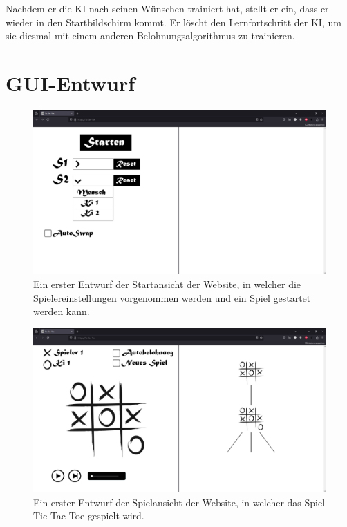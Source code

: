 \documentclass[titlepage]{scrartcl}
\begin{document}
Nachdem er die KI nach seinen Wünschen trainiert hat, stellt er ein, dass er wieder in den Startbildschirm kommt.
Er löscht den Lernfortschritt der KI, um sie diesmal mit einem anderen Belohnungsalgorithmus zu trainieren.

\section{GUI-Entwurf}
\begin{figure}[ht]
\includegraphics[width=\textwidth]{tictactoe_startansicht.png}
\caption{Ein erster Entwurf der Startansicht der Website, in welcher die Spielereinstellungen vorgenommen werden und ein Spiel gestartet werden kann.}
\end{figure}

\begin{figure}[ht]
\includegraphics[width=\textwidth]{tictactoe_spielansicht.png}
\caption{Ein erster Entwurf der Spielansicht der Website, in welcher das Spiel Tic-Tac-Toe gespielt wird.}
\end{figure}
\end{document}
